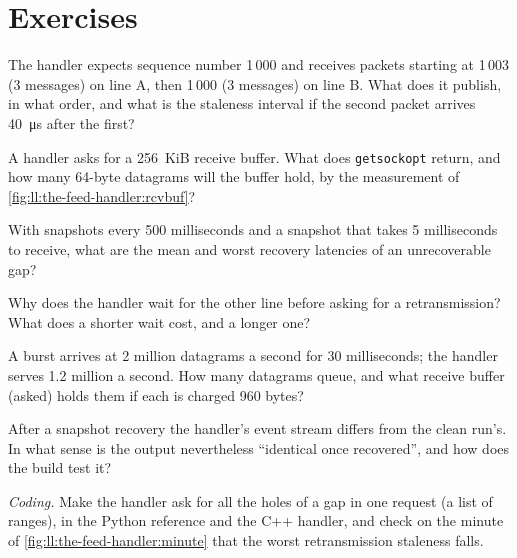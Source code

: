 \section{Exercises}

\begin{exercise}[$\star$]\label{exo:ll:the-feed-handler:1}
The handler expects sequence number 1\,000 and receives packets starting at 1\,003 (3 messages) on line A, then 1\,000 (3
messages) on line B. What does it publish, in what order, and what is the staleness interval if the second packet arrives
\qty{40}{\micro\second} after the first?
\end{exercise}

\begin{exercise}[$\star$]\label{exo:ll:the-feed-handler:2}
A handler asks for a 256~KiB receive buffer. What does \texttt{getsockopt} return, and how many 64-byte datagrams will the
buffer hold, by the measurement of \cref{fig:ll:the-feed-handler:rcvbuf}?
\end{exercise}

\begin{exercise}[$\star$]\label{exo:ll:the-feed-handler:3}
With snapshots every 500 milliseconds and a snapshot that takes 5 milliseconds to receive, what are the mean and worst recovery
latencies of an unrecoverable gap?
\end{exercise}

\begin{exercise}[$\star\star$]\label{exo:ll:the-feed-handler:4}
Why does the handler wait for the other line before asking for a retransmission? What does a shorter wait cost, and a longer
one?
\end{exercise}

\begin{exercise}[$\star\star$]\label{exo:ll:the-feed-handler:5}
A burst arrives at 2 million datagrams a second for 30 milliseconds; the handler serves 1.2 million a second. How many
datagrams queue, and what receive buffer (asked) holds them if each is charged 960 bytes?
\end{exercise}

\begin{exercise}[$\star\star$]\label{exo:ll:the-feed-handler:6}
After a snapshot recovery the handler's event stream differs from the clean run's. In what sense is the output nevertheless
``identical once recovered'', and how does the build test it?
\end{exercise}

\begin{exercise}[$\star\star\star$]\label{exo:ll:the-feed-handler:7}
\emph{Coding.} Make the handler ask for all the holes of a gap in one request (a list of ranges), in the Python reference and
the C++ handler, and check on the minute of \cref{fig:ll:the-feed-handler:minute} that the worst retransmission staleness falls.
\end{exercise}

